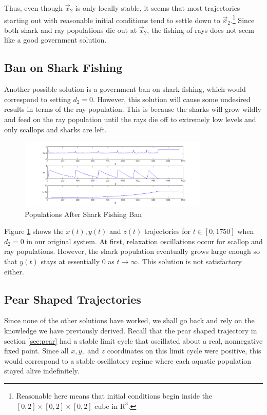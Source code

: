 \documentclass[12pt,journal,compsoc,twoside]{IEEEtran}
\begin{document}
Thus, even though $\vec{x}_2$ is only locally stable, it seems that most trajectories starting out with reasonable initial conditions tend to settle down to $\vec{x}_2$.\footnote{Reasonable here means that initial conditions begin inside the $[0,2] \times [0,2] \times [0,2]$ cube in $\mathrm{R}^3$.} Since both shark and ray populations die out at $\vec{x}_2$, the fishing of rays does not seem like a good government solution.

\subsection{Ban on Shark Fishing}

Another possible solution is a government ban on shark fishing, which would correspond to setting $d_2 = 0$. However, this solution will cause some undesired results in terms of the ray population. This is because the sharks will grow wildly and feed on the ray population until the rays die off to extremely low levels and only scallops and sharks are left.
\begin{figure}[h!]
\centering
\includegraphics[width=3.55in]{bansharkfishing.png}
\caption{Populations After Shark Fishing Ban}
\label{bansharkfishing}
\end{figure}

Figure \ref{bansharkfishing} shows the $x(t), y(t)$ and $z(t)$ trajectories for $t \in [0, 1750]$ when $d_2 = 0$ in our original system. At first, relaxation oscillations occur for scallop and ray populations. However, the shark population eventually grows large enough so that $y(t)$ stays at essentially 0 as $t \to \infty$. This solution is not satisfactory either. 

\subsection{Pear Shaped Trajectories}

Since none of the other solutions have worked, we shall go back and rely on the knowledge we have previously derived. Recall that the pear shaped trajectory in section \ref{sec:pear} had a stable limit cycle that oscillated about a real, nonnegative fixed point. Since all $x,y,$ and $z$ coordinates on this limit cycle were positive, this would correspond to a stable oscillatory regime where each aquatic population stayed alive indefinitely.
\end{document}
